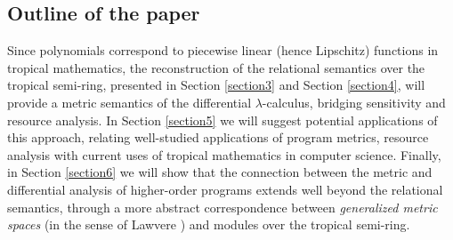 \subsection{Outline of the paper}

Since polynomials correspond to piecewise linear (hence Lipschitz) functions in tropical mathematics, the reconstruction of the relational semantics over the tropical semi-ring, presented in Section \ref{section3} and Section \ref{section4}, will provide a metric semantics of the differential $\lambda$-calculus, bridging sensitivity and resource analysis. 
In Section \ref{section5} we will suggest potential applications of this approach, relating well-studied applications of program metrics, resource analysis with current uses of tropical mathematics in computer science.  
Finally, in Section \ref{section6} we will show that the connection between the metric and differential analysis of higher-order programs extends well beyond the relational semantics, through a more abstract correspondence between  
\emph{generalized metric spaces} (in the sense of Lawvere \cite{}) and modules over the tropical semi-ring.





